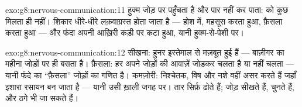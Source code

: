 \begin{solution}{exo:g8:nervous-communication:11}
हुक्म जोड़ पर पहुँचता है और पार नहीं कर पाता:  को कुछ मिलता ही
नहीं। शिकार धीरे-धीरे लक़वाग्रस्त होता जाता है --- होश में, महसूस करता
हुआ, फ़ैसला करता हुआ --- और फंदा अपनी आख़िरी कड़ी पर कटा हुआ, यानी
हुक्म-से-पेशी पर।
\end{solution}

\begin{solution}{exo:g8:nervous-communication:12}
सीखना: हुनर इस्तेमाल से मज़बूत हुई  हैं --- बाज़ीगर का
महीना जोड़ों पर ही बसता है। फ़ैसला: हर  अपने जोड़ों की आवाज़ें
जोड़कर चलता है या नहीं चलता --- यानी फंदे का ``फ़ैसला'' जोड़ों का गणित
है। कमज़ोरी: निश्चेतक, विष और नशे वहीं असर करते हैं जहाँ इशारा रसायन बन
जाता है --- यानी उसी ख़ाली जगह पर। तार सिर्फ़ ढोते हैं; जोड़ सीखते हैं,
चुनते हैं, और ठगे भी जा सकते हैं।
\end{solution}

